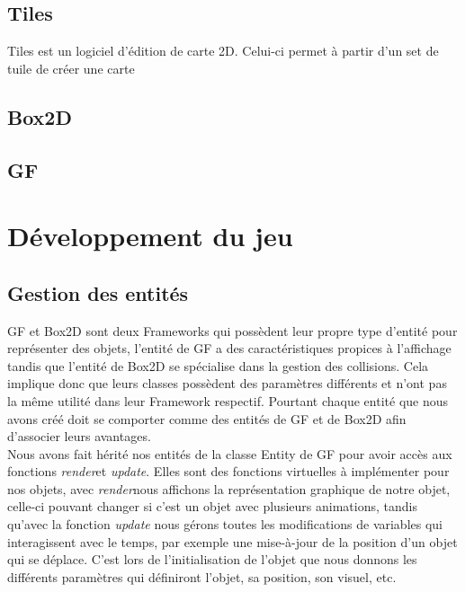 \documentclass{article}
\begin{document}
\subsection{Tiles}
Tiles est un logiciel d'édition de carte 2D. Celui-ci permet à partir d'un set de tuile de créer une carte 
\subsection{Box2D}
\subsection{GF}

\newpage

\section{Développement du jeu}
 
\subsection{Gestion des entités}

GF et Box2D sont deux Frameworks qui possèdent leur propre type d'entité pour représenter des objets, l'entité de GF a des caractéristiques propices à l'affichage tandis que l'entité de Box2D se spécialise dans la gestion des collisions. Cela implique donc que leurs classes possèdent des paramètres différents et n'ont pas la même utilité dans leur Framework respectif. Pourtant chaque entité que nous avons créé doit se comporter comme des entités de GF et de Box2D afin d'associer leurs avantages.\\

Nous avons fait hérité nos entités de la classe Entity de GF pour avoir accès aux fonctions \og \textit{render}\fg et \og \textit{update}\fg. Elles sont des fonctions virtuelles à implémenter pour nos objets, avec \og \textit{render}\fg nous affichons la représentation graphique de notre objet, celle-ci pouvant changer si c'est un objet avec plusieurs animations, tandis qu'avec la fonction \og \textit{update} nous gérons toutes les modifications de variables qui interagissent avec le temps, par exemple une mise-à-jour de la position d'un objet qui se déplace. C'est lors de l'initialisation de l'objet que nous donnons les différents paramètres qui définiront l'objet, sa position, son visuel, etc.\\
\end{document}
